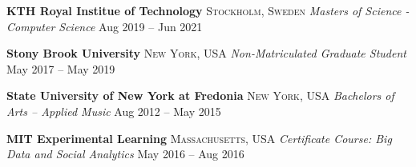 \documentclass[10pt,letterpaper]{article}
\begin{document}
\headedsection 
{\textbf{KTH Royal Institue of Technology}}
{\textsc{Stockholm, Sweden}} {														
	\headedsubsection
	{\textit{Masters of Science - Computer Science}}
	{Aug 2019 -- Jun 2021}
	{\bodytext{}}
}
\vspace{-5mm}


\headedsection 
{\textbf{Stony Brook University}}
{\textsc{New York, USA}} {														
	\headedsubsection
	{\textit{Non-Matriculated Graduate Student}}
	{May 2017 -- May 2019}
	{\bodytext{}}
}
\vspace{-5mm}


\headedsection
{\textbf{State University of New York at Fredonia}}
{\textsc{New York, USA}} {															
	\headedsubsection
	{\textit{Bachelors of Arts -- Applied Music}}
	{Aug 2012 -- May 2015}
	{\bodytext{}}
}
\vspace{-5mm}


\headedsection 
{\textbf{MIT Experimental Learning}}
{\textsc{Massachusetts, USA}} {
	\headedsubsection 
	{\textit{Certificate Course: Big Data and Social Analytics}}
	{May 2016 -- Aug 2016}
	{\bodytext{}}
}



\spacedhrule{-1em}{-0.9em} 










\end{document}
